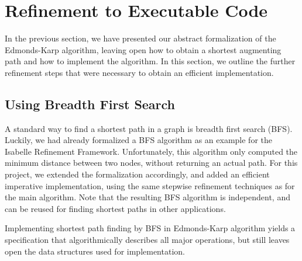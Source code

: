 \documentclass{llncs}
\begin{document}
    
\section{Refinement to Executable Code}\label{sec:executable}
  In the previous section, we have presented our abstract formalization of the Edmonds-Karp algorithm,
  leaving open how to obtain a shortest augmenting path and how to implement the algorithm. 
  In this section, we outline the further refinement steps that were necessary to obtain an efficient implementation.

  \subsection{Using Breadth First Search}
  A standard way to find a shortest path in a graph is breadth first search (BFS). Luckily, we had already formalized a BFS algorithm as an example for the 
  Isabelle Refinement Framework. Unfortunately, this algorithm only computed the minimum distance between two nodes, without returning an actual path. For this project, we extended the formalization accordingly, and added an efficient imperative implementation, using the same stepwise refinement techniques as for the main algorithm. Note that the resulting BFS algorithm is independent, and can be reused for finding shortest paths in other applications. 
  
  Implementing shortest path finding by BFS in Edmonds-Karp algorithm yields a specification that algorithmically describes all major operations, but still leaves open the data structures used for implementation.
  
\end{document}
